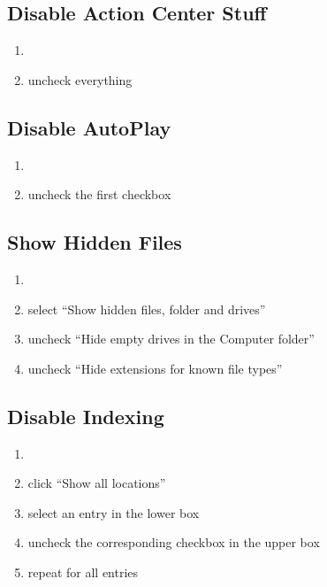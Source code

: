 \documentclass{itsarticle}
\begin{document}
\subsection{Disable Action Center Stuff}
\label{sub:disable_action_center_stuff}

\begin{enumerate}
    \item {}
    \item uncheck everything
\end{enumerate}

\subsection{Disable AutoPlay}
\label{sub:disable_autoplay}

\begin{enumerate}
    \item {}
    \item uncheck the first checkbox
\end{enumerate}

\subsection{Show Hidden Files}
\label{sub:show_hidden_files}

\begin{enumerate}
    \item {}
    \item select ``Show hidden files, folder and drives''
    \item uncheck ``Hide empty drives in the Computer folder''
    \item uncheck ``Hide extensions for known file types''
\end{enumerate}

\subsection{Disable Indexing}
\label{sub:disable_indexing}

\begin{enumerate}
    \item {}
    \item click ``Show all locations''
    \item select an entry in the lower box
    \item uncheck the corresponding checkbox in the upper box
    \item repeat for all entries
\end{enumerate}
\end{document}
